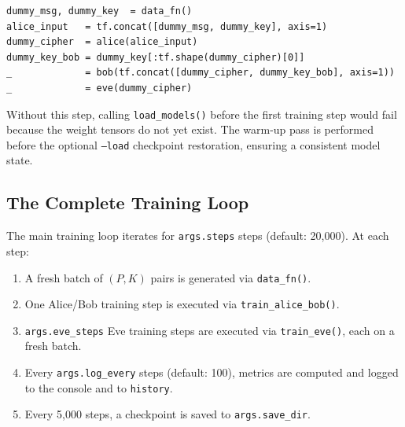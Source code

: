 \documentclass[12pt, a4paper]{article}
\newcommand{\code}[1]{\texttt{\color{CodeRed}#1}}
\begin{document}
\begin{lstlisting}[caption={Warm-up forward pass to trigger weight allocation}]
dummy_msg, dummy_key  = data_fn()
alice_input   = tf.concat([dummy_msg, dummy_key], axis=1)
dummy_cipher  = alice(alice_input)
dummy_key_bob = dummy_key[:tf.shape(dummy_cipher)[0]]
_             = bob(tf.concat([dummy_cipher, dummy_key_bob], axis=1))
_             = eve(dummy_cipher)
\end{lstlisting}

Without this step, calling \code{load\_models()} before the first
training step would fail because the weight tensors do not yet exist.
The warm-up pass is performed before the optional \code{--load}
checkpoint restoration, ensuring a consistent model state.

\subsection{The Complete Training Loop}
\label{subsec:training_loop}

The main training loop iterates for \code{args.steps} steps
(default: 20{,}000). At each step:

\begin{enumerate}[leftmargin=2em, itemsep=4pt]
  \item A fresh batch of $(P, K)$ pairs is generated via \code{data\_fn()}.
  \item One Alice/Bob training step is executed via \code{train\_alice\_bob()}.
  \item \code{args.eve\_steps} Eve training steps are executed via
        \code{train\_eve()}, each on a fresh batch.
  \item Every \code{args.log\_every} steps (default: 100), metrics are
        computed and logged to the console and to \code{history}.
  \item Every 5{,}000 steps, a checkpoint is saved to \code{args.save\_dir}.
\end{enumerate}
\end{document}
